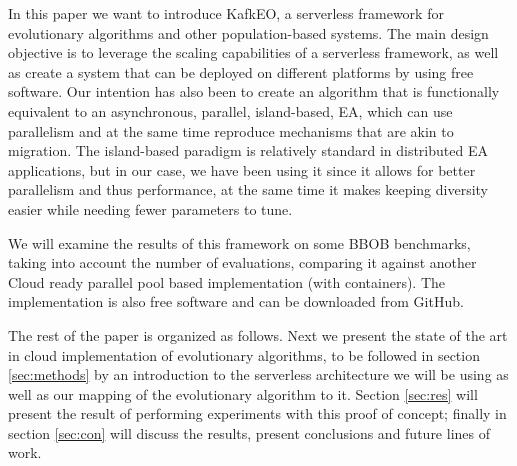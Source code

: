 \documentclass{llncs}
\begin{document}
  In this paper we want to introduce KafkEO, a serverless framework for
  evolutionary algorithms and other population-based systems. The main
  design objective is to leverage the scaling capabilities of a
  serverless framework, as well as create a system that can be deployed
  on different platforms by using free software. Our intention has
  also been to create an algorithm that is functionally equivalent to an
   asynchronous, parallel, island-based, EA, which can use parallelism and at the same
  time reproduce mechanisms that are akin to migration. The island-based 
  paradigm is relatively standard in distributed EA applications, but in our case, 
  we have been using it since it allows for better parallelism
  and thus performance, at the same time it makes keeping diversity
  easier while needing fewer parameters to tune.

  
  
  We will examine the results of this framework on some BBOB benchmarks,
  taking into account
  the number of evaluations, comparing it
  against another Cloud ready parallel pool based implementation (with
  containers).
  The
  implementation is also free software and can be downloaded from
  GitHub.


  The rest of the paper is organized as follows. Next we present the
  state of the art in cloud implementation of evolutionary algorithms,
  to be followed in section \ref{sec:methods} by an introduction to the
  serverless architecture we will be using as well as our mapping of the
  evolutionary algorithm to it. Section \ref{sec:res} will present the
  result of performing experiments with this proof of concept; finally
  in section \ref{sec:con} will discuss the results, present conclusions
  and future lines of work.
\end{document}
